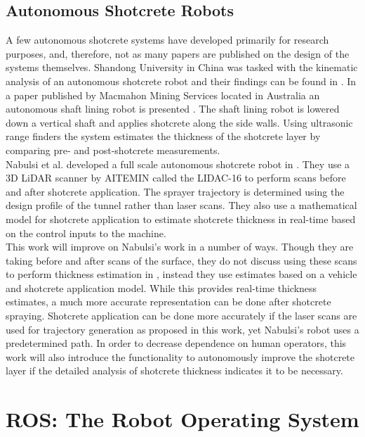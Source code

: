 \subsection{Autonomous Shotcrete Robots}

A few autonomous shotcrete systems have developed primarily for research purposes, and, therefore, not as many papers are published on the design of the systems themselves. Shandong University in China was tasked with the kinematic analysis of an autonomous shotcrete robot and their findings can be found in \cite{kinshot}. In a paper published by Macmahon Mining Services located in Australia an autonomous shaft lining robot is presented \cite{sliner}. The shaft lining robot is lowered down a vertical shaft and applies shotcrete along the side walls. Using ultrasonic range finders the system estimates the thickness of the shotcrete layer by comparing pre- and post-shotcrete measurements.\\

Nabulsi et al. developed a full scale autonomous shotcrete robot in \cite{nabulsi}. They use a 3D LiDAR scanner by AITEMIN called the LIDAC-16 to perform scans before and after shotcrete application. The sprayer trajectory is determined using the design profile of the tunnel rather than laser scans. They also use a mathematical model for shotcrete application to estimate shotcrete thickness in real-time based on the control inputs to the machine.\\

This work will improve on Nabulsi's work in a number of ways. Though they are taking before and after scans of the surface, they do not discuss using these scans to perform thickness estimation in \cite{nabulsi}, instead they use estimates based on a vehicle and shotcrete application model. While this provides real-time thickness estimates, a much more accurate representation can be done after shotcrete spraying. Shotcrete application can be done more accurately if the laser scans are used for trajectory generation as proposed in this work, yet Nabulsi's robot uses a predetermined path. In order to decrease dependence on human operators, this work will also introduce the functionality to autonomously improve the shotcrete layer if the detailed analysis of shotcrete thickness indicates it to be necessary.\\


\section{ROS: The Robot Operating System}
\label{sec:ros}

